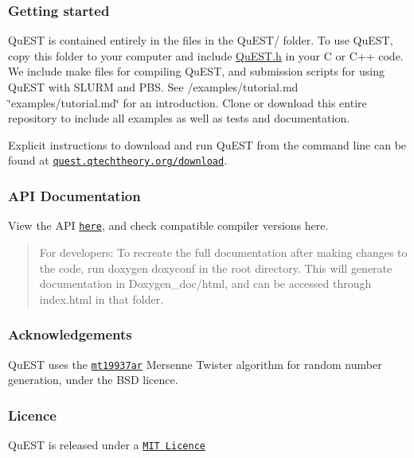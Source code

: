 \subsubsection*{Getting started}

Qu\+E\+ST is contained entirely in the files in the {\ttfamily Qu\+E\+S\+T/} folder. To use Qu\+E\+ST, copy this folder to your computer and include {\ttfamily \mbox{\hyperlink{QuEST_8h}{Qu\+E\+S\+T.\+h}}} in your {\ttfamily C} or {\ttfamily C++} code. We include make files for compiling Qu\+E\+ST, and submission scripts for using Qu\+E\+ST with S\+L\+U\+RM and P\+BS. See /examples/tutorial.md \char`\"{}examples/tutorial.\+md\char`\"{} for an introduction. Clone or download this entire repository to include all examples as well as tests and documentation.

Explicit instructions to download and run Qu\+E\+ST from the command line can be found at \href{https://quest.qtechtheory.org/download/}{\tt quest.\+qtechtheory.\+org/download}.

\subsubsection*{A\+PI Documentation}

View the A\+PI \href{https://aniabrown.github.io/QuEST/QuEST_8h.html}{\tt here}, and check compatible compiler versions here.

\begin{quote}
For developers\+: To recreate the full documentation after making changes to the code, run doxygen doxyconf in the root directory. This will generate documentation in Doxygen\+\_\+doc/html, and can be accessed through index.\+html in that folder. \end{quote}


\subsubsection*{Acknowledgements}

Qu\+E\+ST uses the \href{http://www.math.sci.hiroshima-u.ac.jp/~m-mat/MT/MT2002/emt19937ar.html}{\tt mt19937ar} Mersenne Twister algorithm for random number generation, under the B\+SD licence.

\subsubsection*{Licence}

Qu\+E\+ST is released under a \href{https://github.com/aniabrown/QuEST/blob/master/LICENCE.txt}{\tt M\+IT Licence} 